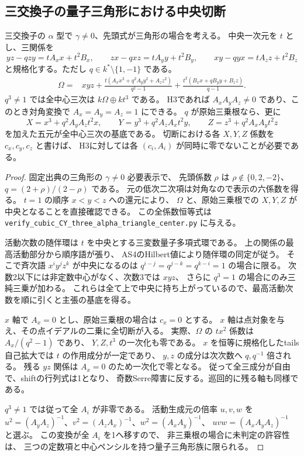 \subsection{三交換子の量子三角形における中央切断}
\label{subsec:cubic-CY-three-alpha-quantum-triangle}

\begin{proposition}\label{prop:cubic-CY-three-alpha-quantum-triangle-incidence}
三交換子の $\alpha$ 型で $\gamma\ne0$、先頭式が三角形の場合を考える。
中央一次元を $t$ とし、三関係を
\[
 yz-qzy=tA_x x+t^2B_x,\qquad zx-qxz=tA_y y+t^2B_y,\qquad
 xy-qyx=tA_z z+t^2B_z
\]
と規格化する。ただし $q\in k^*\setminus\{1,-1\}$ である。
\begin{align*}
 \Omega={}&xyz+\frac{t(A_x x^2+q^2 A_y y^2+A_z z^2)}{q^2-1}
                  +\frac{t^2(B_x x+q B_y y+B_z z)}{q-1}.
\end{align*}
$q^3\ne1$ では全中心三次は $k\Omega\oplus kt^3$ である。
H3であれば $A_x A_y A_z\ne0$ であり、このとき対角変換で
$A_x=A_y=A_z=1$ にできる。
$q$ が原始三乗根なら、更に
\[
 X=x^3+q^2A_yA_z t^2x,\qquad
 Y=y^3+q^2A_zA_x t^2y,\qquad
 Z=z^3+q^2A_xA_y t^2z
\]
を加えた五元が全中心三次の基底である。
切断における各 $X,Y,Z$ 係数を $c_x,c_y,c_z$ と書けば、
H3に対しては各 $(c_i,A_i)$ が同時に零でないことが必要である。
\end{proposition}
\begin{proof}
固定出典\cite{AS4CYpinned}の三角形の $\gamma\ne0$ 必要表示で、
先頭係数 $\rho$ は $\rho\notin\{0,2,-2\}$、$q=(2+\rho)/(2-\rho)$ である。
元の低次二次項は対角なので表示の六係数を得る。
$t=1$ の順序 $x<y<z$ への還元により、
$\Omega$ と、原始三乗根での $X,Y,Z$ が中央となることを直接確認できる。
この全係数恒等式は
\texttt{verify\_cubic\_CY\_three\_alpha\_triangle\_center.py} に与える。

活動次数の随伴環は $t$ を中央とする三変数量子多項式環である。
上の関係の最高活動部分から順序語が張り、
AS4のHilbert値により随伴環の同定が従う。
そこで斉次語 $x^iy^jz^k$ が中央になるのは
$q^{i-j}=q^{j-k}=q^{k-i}=1$ の場合に限る。
次数2以下には非定数中心がなく、次数3では $xyz$、
さらに $q^3=1$ の場合にのみ三純三乗が加わる。
これらは全て上で中央に持ち上がっているので、最高活動次数を順に引くと主張の基底を得る。

$x$ 軸で $A_x=0$ とし、原始三乗根の場合は $c_x=0$ とする。
$x$ 軸は点対象を与え、その点イデアルの二乗に全切断が入る。
実際、$\Omega$ の $t x^2$ 係数は $A_x/(q^2-1)$ であり、
$Y,Z,t^3$ の一次化も零である。
$x$ を恒等に規格化したtails自己拡大では $t$ の作用成分が一定であり、
$y,z$ の成分は次次数へ $q,q^{-1}$ 倍される。
残る $yz$ 関係は $A_x=0$ のため一次化で零となる。
従って全三成分が自由で、shiftの行列式は1となり、
奇数Serre障害に反する。巡回的に残る軸も同様である。

$q^3\ne1$ では従って全 $A_i$ が非零である。
活動生成元の倍率 $u,v,w$ を
$u^2=(A_yA_z)^{-1}$、$v^2=(A_zA_x)^{-1}$、$w^2=(A_xA_y)^{-1}$、
$uvw=(A_xA_yA_z)^{-1}$ と選ぶ。
この変換が全 $A_i$ を1へ移すので、
非三乗根の場合に未判定の許容性は、
三つの定数項と中心ペンシルを持つ量子三角形族に限られる。
\end{proof}

